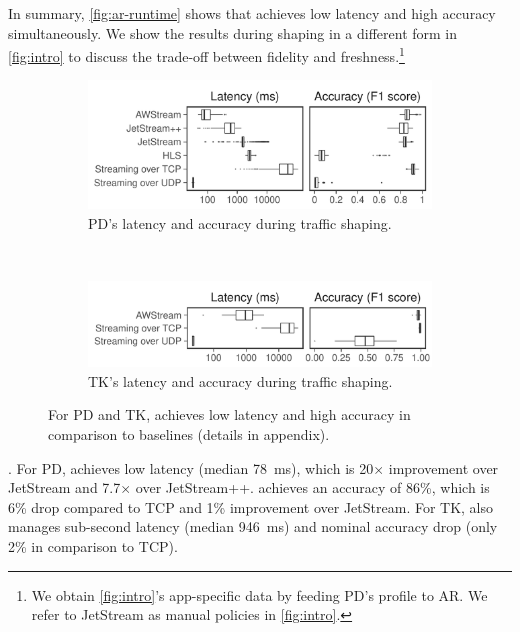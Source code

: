 In summary, \autoref{fig:ar-runtime} shows that \sysname{} achieves low latency
and high accuracy simultaneously. We show the results during shaping in a
different form in \autoref{fig:intro} to discuss the trade-off between fidelity
and freshness.\footnote{We obtain \autoref{fig:intro}'s app-specific data by
  feeding PD's profile to AR. We refer to JetStream as manual policies in
  \autoref{fig:intro}.}

\begin{figure}[t]
  \begin{subfigure}[t]{\columnwidth}
    \centering
    \includegraphics[width=\columnwidth]{figures/runtime_mot-boxplot.pdf}
    \caption{PD's latency and accuracy during traffic shaping.}
    \label{fig:pd-runtime-boxplot}
  \end{subfigure}
  \\
  \begin{subfigure}[t]{\columnwidth}
    \centering
    \includegraphics[width=\columnwidth]{figures/runtime_tk-boxplot2.pdf}
    \caption[]{TK's latency and accuracy during traffic shaping.\footnotemark}
    \label{fig:tk-runtime-boxplot}
  \end{subfigure}
  \caption{For PD and TK, \sysname{} achieves low latency and high accuracy in
    comparison to baselines (details in appendix).}
  \label{fig:pd-tk}
\end{figure}


. For PD,
\sysname{} achieves low latency (median \SI{78}{ms}), which is 20$\times$
improvement over JetStream and 7.7$\times$ over JetStream++. \sysname{} achieves
an accuracy of 86\%, which is 6\% drop compared to TCP and 1\% improvement over
JetStream. For TK, \sysname{} also manages sub-second latency (median
\SI{946}{\ms}) and nominal accuracy drop (only 2\% in comparison to TCP).

